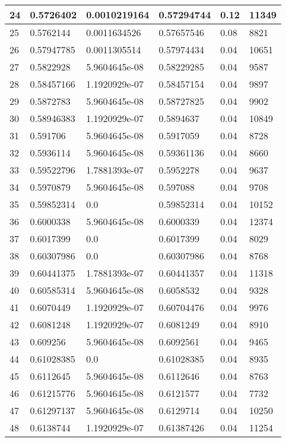 \begin{longtable}{|l|l|l|l|l|l|}
24 & 0.5726402 & 0.0010219164 & 0.57294744 & 0.12 & 11349 \\ \hline 
25 & 0.5762144 & 0.0011634526 & 0.57657546 & 0.08 & 8821 \\ \hline 
26 & 0.57947785 & 0.0011305514 & 0.57974434 & 0.04 & 10651 \\ \hline 
27 & 0.5822928 & 5.9604645e-08 & 0.58229285 & 0.04 & 9587 \\ \hline 
28 & 0.58457166 & 1.1920929e-07 & 0.58457154 & 0.04 & 9897 \\ \hline 
29 & 0.5872783 & 5.9604645e-08 & 0.58727825 & 0.04 & 9902 \\ \hline 
30 & 0.58946383 & 1.1920929e-07 & 0.5894637 & 0.04 & 10849 \\ \hline 
31 & 0.591706 & 5.9604645e-08 & 0.5917059 & 0.04 & 8728 \\ \hline 
32 & 0.5936114 & 5.9604645e-08 & 0.59361136 & 0.04 & 8660 \\ \hline 
33 & 0.59522796 & 1.7881393e-07 & 0.5952278 & 0.04 & 9637 \\ \hline 
34 & 0.5970879 & 5.9604645e-08 & 0.597088 & 0.04 & 9708 \\ \hline 
35 & 0.59852314 & 0.0 & 0.59852314 & 0.04 & 10152 \\ \hline 
36 & 0.6000338 & 5.9604645e-08 & 0.6000339 & 0.04 & 12374 \\ \hline 
37 & 0.6017399 & 0.0 & 0.6017399 & 0.04 & 8029 \\ \hline 
38 & 0.60307986 & 0.0 & 0.60307986 & 0.04 & 8768 \\ \hline 
39 & 0.60441375 & 1.7881393e-07 & 0.60441357 & 0.04 & 11318 \\ \hline 
40 & 0.60585314 & 5.9604645e-08 & 0.6058532 & 0.04 & 9328 \\ \hline 
41 & 0.6070449 & 1.1920929e-07 & 0.60704476 & 0.04 & 9976 \\ \hline 
42 & 0.6081248 & 1.1920929e-07 & 0.6081249 & 0.04 & 8910 \\ \hline 
43 & 0.609256 & 5.9604645e-08 & 0.6092561 & 0.04 & 9465 \\ \hline 
44 & 0.61028385 & 0.0 & 0.61028385 & 0.04 & 8935 \\ \hline 
45 & 0.6112645 & 5.9604645e-08 & 0.6112646 & 0.04 & 8763 \\ \hline 
46 & 0.61215776 & 5.9604645e-08 & 0.6121577 & 0.04 & 7732 \\ \hline 
47 & 0.61297137 & 5.9604645e-08 & 0.6129714 & 0.04 & 10250 \\ \hline 
48 & 0.6138744 & 1.1920929e-07 & 0.61387426 & 0.04 & 11254 \\ \hline 

\end{longtable}
